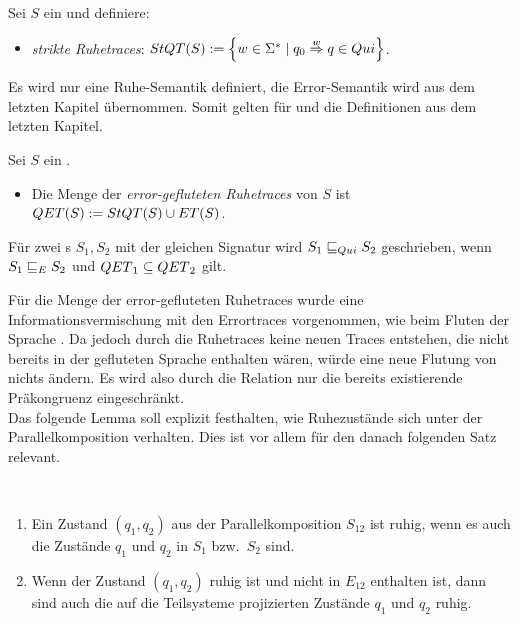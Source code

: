 \begin{Def}[Ruhetraces]
\label{DefRuhetraces}
  Sei $S$ ein \EIO{} und definiere:
  \begin{itemize}
    \item \emph{strikte Ruhetraces}: $StQT{}(S) := \left\{w\in\Sigma ^*\mid q_0
      \overset{w}{\Rightarrow} q\in Qui\right\}$.
  \end{itemize}
\end{Def}

Es wird nur eine Ruhe-Semantik definiert, die Error-Semantik wird aus
dem letzten Kapitel übernommen. Somit gelten für \ET{} und \EL{} die
Definitionen aus dem letzten Kapitel.

\begin{Def}
\label{DefQTQL}
  Sei $S$ ein \EIO{}.
  \begin{itemize}
    \item Die Menge der \emph{error-gefluteten Ruhetraces} von $S$ ist
      $QET{}(S) := StQT{}(S)\cup ET{}(S)$.
  \end{itemize}
  Für zwei \EIO{}s $S_1, S_2$ mit der gleichen Signatur wird
  $S_1\sqsubseteq _{Qui} S_2$ geschrieben, wenn $S_1\sqsubseteq _E S_2$ und $QET{}_1\subseteq
  QET{}_2$ gilt.
\end{Def}

Für die Menge der error-gefluteten Ruhetraces \QT{} wurde eine Informationsvermischung
mit den Errortraces vorgenommen, wie beim Fluten der Sprache \EL{}. Da jedoch
durch die Ruhetraces keine neuen Traces entstehen, die nicht bereits in der
gefluteten Sprache \EL{} enthalten wären, würde eine neue Flutung von \EL{}
nichts ändern. Es wird also durch die Relation \QRel{} nur die
bereits existierende Präkongruenz \ERel{} eingeschränkt.\\
Das folgende Lemma soll explizit festhalten, wie Ruhezustände sich unter der
Parallelkomposition verhalten. Dies ist vor allem für den danach folgenden Satz
relevant.

\vspace{0.5cm}
\begin{lem}
\label{lemRuheParallelkomp}
  ~
  \begin{enumerate}
    \item Ein Zustand $(q_1,q_2)$ aus der Parallelkomposition $S_{12}$
      ist ruhig, wenn es auch die Zustände $q_1$ und $q_2$ in $S_1$ bzw.\ $S_2$
      sind.
    \item Wenn der Zustand $(q_1,q_2)$ ruhig ist und nicht in $E_{12}$
      enthalten ist, dann sind auch die auf die Teilsysteme projizierten
      Zustände $q_1$ und $q_2$ ruhig.
  \end{enumerate}
\end{lem}

